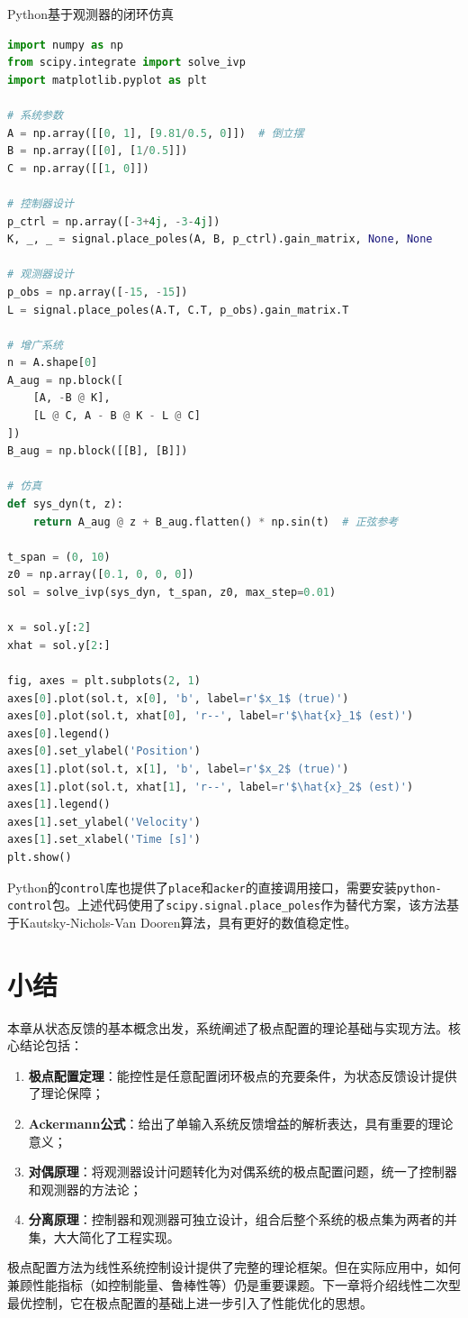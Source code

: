 \begin{mycode}{Python基于观测器的闭环仿真}
\begin{lstlisting}[language=Python]
import numpy as np
from scipy.integrate import solve_ivp
import matplotlib.pyplot as plt

# 系统参数
A = np.array([[0, 1], [9.81/0.5, 0]])  # 倒立摆
B = np.array([[0], [1/0.5]])
C = np.array([[1, 0]])

# 控制器设计
p_ctrl = np.array([-3+4j, -3-4j])
K, _, _ = signal.place_poles(A, B, p_ctrl).gain_matrix, None, None

# 观测器设计
p_obs = np.array([-15, -15])
L = signal.place_poles(A.T, C.T, p_obs).gain_matrix.T

# 增广系统
n = A.shape[0]
A_aug = np.block([
    [A, -B @ K],
    [L @ C, A - B @ K - L @ C]
])
B_aug = np.block([[B], [B]])

# 仿真
def sys_dyn(t, z):
    return A_aug @ z + B_aug.flatten() * np.sin(t)  # 正弦参考

t_span = (0, 10)
z0 = np.array([0.1, 0, 0, 0])
sol = solve_ivp(sys_dyn, t_span, z0, max_step=0.01)

x = sol.y[:2]
xhat = sol.y[2:]

fig, axes = plt.subplots(2, 1)
axes[0].plot(sol.t, x[0], 'b', label=r'$x_1$ (true)')
axes[0].plot(sol.t, xhat[0], 'r--', label=r'$\hat{x}_1$ (est)')
axes[0].legend()
axes[0].set_ylabel('Position')
axes[1].plot(sol.t, x[1], 'b', label=r'$x_2$ (true)')
axes[1].plot(sol.t, xhat[1], 'r--', label=r'$\hat{x}_2$ (est)')
axes[1].legend()
axes[1].set_ylabel('Velocity')
axes[1].set_xlabel('Time [s]')
plt.show()
\end{lstlisting}
\end{mycode}

\begin{remark}
Python的\texttt{control}库也提供了\texttt{place}和\texttt{acker}的直接调用接口，需要安装\texttt{python-control}包。上述代码使用了\texttt{scipy.signal.place\_poles}作为替代方案，该方法基于Kautsky-Nichols-Van Dooren算法，具有更好的数值稳定性。
\end{remark}

\section{小结}

本章从状态反馈的基本概念出发，系统阐述了极点配置的理论基础与实现方法。核心结论包括：
\begin{enumerate}
\item \textbf{极点配置定理}：能控性是任意配置闭环极点的充要条件，为状态反馈设计提供了理论保障；
\item \textbf{Ackermann公式}：给出了单输入系统反馈增益的解析表达，具有重要的理论意义；
\item \textbf{对偶原理}：将观测器设计问题转化为对偶系统的极点配置问题，统一了控制器和观测器的方法论；
\item \textbf{分离原理}：控制器和观测器可独立设计，组合后整个系统的极点集为两者的并集，大大简化了工程实现。
\end{enumerate}

极点配置方法为线性系统控制设计提供了完整的理论框架。但在实际应用中，如何兼顾性能指标（如控制能量、鲁棒性等）仍是重要课题。下一章将介绍线性二次型最优控制，它在极点配置的基础上进一步引入了性能优化的思想。
